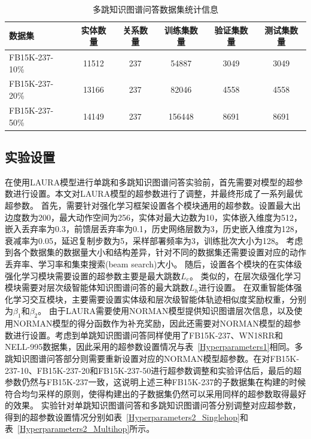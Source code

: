 \documentclass[algorithmlist, AutoFakeBold, AutoFakeSlant, figurelist, tablelist, nomlist, masters]{seuthesix}
\begin{document}
\begin{table}
  \centering
  \begin{tabular*}{0.95\textwidth}{@{\extracolsep{\fill}}lccccc}
		\toprule[1pt]
    数据集 & 实体数量 & 关系数量 & 训练集数量 & 验证集数量 & 测试集数量 \\ \hline
    FB15K-237-10\% & 11512 & 237 & 54887 & 3049 & 3049\\
    FB15K-237-20\% & 13166 & 237 & 82046 & 4558 & 4558\\
    FB15K-237-50\% & 14149 & 237 & 156448 & 8691 & 8691\\
		\bottomrule[1pt]
	\end{tabular*}
  \caption{多跳知识图谱问答数据集统计信息}
  \label{Datasets2}
\end{table}

\subsection{实验设置}
在使用LAURA模型进行单跳和多跳知识图谱问答实验前，首先需要对模型的超参数进行设置。本文对LAURA模型的超参数进行了调整，并最终形成了一系列最优超参数。
首先，需要针对强化学习框架设置各个模块通用的超参数。设置最大出边度数为200，最大动作空间为256，实体对最大边数为10，实体嵌入维度为512，嵌入丢弃率为0.3，前馈层丢弃率为0.1，历史网络层数为3，历史嵌入维度为128，衰减率为0.05，延迟复制步数为5，采样部署频率为3，训练批次大小为128。
考虑到各个数据集的数据量大小和结构差异，针对不同的数据集还需要设置对应的动作丢弃率、学习率和集束搜索(beam search)大小。
随后，设置各个模块的在实体级强化学习模块需要设置的超参数主要是最大跳数$L_e$。
类似的，在层次级强化学习模块需要对层次级智能体知识图谱问答的最大跳数$L_h$进行设置。
在双重智能体强化学习交互模块，主要需要设置实体级和层次级智能体轨迹相似度奖励权重，分别为$\beta_1$和$\beta_2$。
由于LAURA需要使用NORMAN模型提供知识图谱层次信息，以及使用NORMAN模型的得分函数作为补充奖励，因此还需要对NORMAN模型的超参数进行设置。考虑到单跳知识图谱问答同样使用了FB15K-237、WN18RR和NELL-995数据集，因此采用的超参数设置情况与表~\ref{Hyperparameters1}相同。多跳知识图谱问答部分则需要重新设置对应的NORMAN模型超参数。在对FB15K-237-10、FB15K-237-20和FB15K-237-50进行超参数调整和实验评估后，最后的超参数仍然与FB15K-237一致，这说明上述三种FB15K-237的子数据集在构建的时候符合均匀采样的原则，使得构建出的子数据集仍然可以采用同样的超参数取得最好的效果。
实验针对单跳知识图谱问答和多跳知识图谱问答分别调整对应超参数，得到的超参数设置情况分别如表~\ref{Hyperparameters2_Singlehop}和表~\ref{Hyperparameters2_Multihop}所示。
\end{document}
